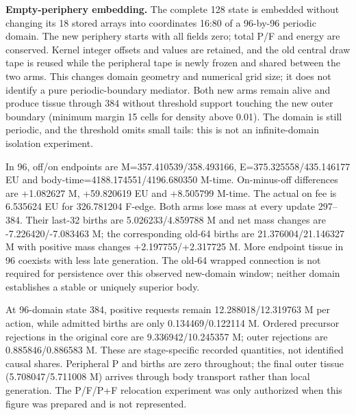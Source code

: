 \textbf{Empty-periphery embedding.} The complete 128 state is embedded without changing its 18 stored arrays into coordinates 16:80 of a 96-by-96 periodic domain. The new periphery starts with all fields zero; total P/F and energy are conserved. Kernel integer offsets and values are retained, and the old central draw tape is reused while the peripheral tape is newly frozen and shared between the two arms. This changes domain geometry and numerical grid size; it does not identify a pure periodic-boundary mediator. Both new arms remain alive and produce tissue through 384 without threshold support touching the new outer boundary (minimum margin 15 cells for density above 0.01). The domain is still periodic, and the threshold omits small tails: this is not an infinite-domain isolation experiment.

In 96, off/on endpoints are M=357.410539/358.493166, E=375.325558/435.146177 EU and body-time=4188.174551/4196.680350 M-time. On-minus-off differences are +1.082627 M, +59.820619 EU and +8.505799 M-time. The actual on fee is 6.535624 EU for 326.781204 F-edge. Both arms lose mass at every update 297--384. Their last-32 births are 5.026233/4.859788 M and net mass changes are -7.226420/-7.083463 M; the corresponding old-64 births are 21.376004/21.146327 M with positive mass changes +2.197755/+2.317725 M. More endpoint tissue in 96 coexists with less late generation. The old-64 wrapped connection is not required for persistence over this observed new-domain window; neither domain establishes a stable or uniquely superior body.

At 96-domain state 384, positive requests remain 12.288018/12.319763 M per action, while admitted births are only 0.134469/0.122114 M. Ordered precursor rejections in the original core are 9.336942/10.245357 M; outer rejections are 0.885846/0.886583 M. These are stage-specific recorded quantities, not identified causal shares. Peripheral P and births are zero throughout; the final outer tissue (5.708047/5.711008 M) arrives through body transport rather than local generation. The P/F/P+F relocation experiment was only authorized when this figure was prepared and is not represented.
